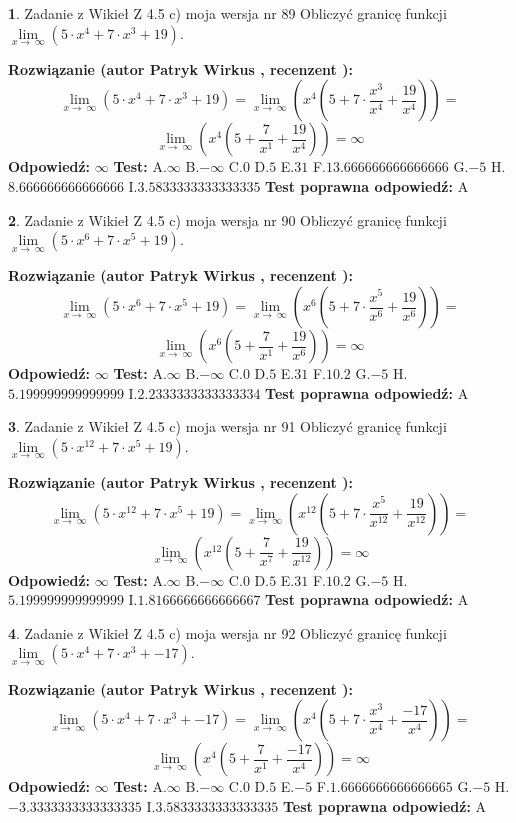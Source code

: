 \documentclass[12pt, a4paper]{article}
\theoremstyle{definition} %
\newtheorem{zad}{}
\newcommand{\zadStart}[1]{\begin{zad}#1\newline}
\newcommand{\zadStop}{\end{zad}}
\newcommand{\rozwStart}[2]{\noindent \textbf{Rozwiązanie (autor #1 , recenzent #2): }\newline}
\newcommand{\rozwStop}{\newline}
\newcommand{\odpStart}{\noindent \textbf{Odpowiedź:}\newline}
\newcommand{\odpStop}{\newline}
\newcommand{\testStart}{\noindent \textbf{Test:}\newline}
\newcommand{\testStop}{\newline}
\newcommand{\kluczStart}{\noindent \textbf{Test poprawna odpowiedź:}\newline}
\newcommand{\kluczStop}{\newline}
\begin{document}
\zadStart{Zadanie z Wikieł Z 4.5 c) moja wersja nr 89}
Obliczyć granicę funkcji  $\lim\limits_{x\to\ \infty}(5 \cdot x^{4}+7 \cdot x^{3}+19)$.
\zadStop
\rozwStart{Patryk Wirkus}{}
$$\lim\limits_{x\to\ \infty}(5 \cdot x^{4}+7 \cdot x^{3}+19) = \lim\limits_{x\to\ \infty}(x^{4}(5 +7 \cdot \frac{x^{3}}{x^{4}}+\frac{19}{x^{4}})) =$$ $$\lim\limits_{x\to\ \infty}(x^{4}(5 +\frac{7}{x^{1}}+\frac{19}{x^{4}})) =\infty$$
\rozwStop
\odpStart
$\infty$
\odpStop
\testStart
A.$\infty$ B.$-\infty$ C.$0$ D.$5$ E.$31$
F.$13.666666666666666$ G.$-5$
H.$8.666666666666666$
I.$3.5833333333333335$
\testStop
\kluczStart
A
\kluczStop



\zadStart{Zadanie z Wikieł Z 4.5 c) moja wersja nr 90}
Obliczyć granicę funkcji  $\lim\limits_{x\to\ \infty}(5 \cdot x^{6}+7 \cdot x^{5}+19)$.
\zadStop
\rozwStart{Patryk Wirkus}{}
$$\lim\limits_{x\to\ \infty}(5 \cdot x^{6}+7 \cdot x^{5}+19) = \lim\limits_{x\to\ \infty}(x^{6}(5 +7 \cdot \frac{x^{5}}{x^{6}}+\frac{19}{x^{6}})) =$$ $$\lim\limits_{x\to\ \infty}(x^{6}(5 +\frac{7}{x^{1}}+\frac{19}{x^{6}})) =\infty$$
\rozwStop
\odpStart
$\infty$
\odpStop
\testStart
A.$\infty$ B.$-\infty$ C.$0$ D.$5$ E.$31$
F.$10.2$ G.$-5$
H.$5.199999999999999$
I.$2.2333333333333334$
\testStop
\kluczStart
A
\kluczStop



\zadStart{Zadanie z Wikieł Z 4.5 c) moja wersja nr 91}
Obliczyć granicę funkcji  $\lim\limits_{x\to\ \infty}(5 \cdot x^{12}+7 \cdot x^{5}+19)$.
\zadStop
\rozwStart{Patryk Wirkus}{}
$$\lim\limits_{x\to\ \infty}(5 \cdot x^{12}+7 \cdot x^{5}+19) = \lim\limits_{x\to\ \infty}(x^{12}(5 +7 \cdot \frac{x^{5}}{x^{12}}+\frac{19}{x^{12}})) =$$ $$\lim\limits_{x\to\ \infty}(x^{12}(5 +\frac{7}{x^{7}}+\frac{19}{x^{12}})) =\infty$$
\rozwStop
\odpStart
$\infty$
\odpStop
\testStart
A.$\infty$ B.$-\infty$ C.$0$ D.$5$ E.$31$
F.$10.2$ G.$-5$
H.$5.199999999999999$
I.$1.8166666666666667$
\testStop
\kluczStart
A
\kluczStop



\zadStart{Zadanie z Wikieł Z 4.5 c) moja wersja nr 92}
Obliczyć granicę funkcji  $\lim\limits_{x\to\ \infty}(5 \cdot x^{4}+7 \cdot x^{3}+-17)$.
\zadStop
\rozwStart{Patryk Wirkus}{}
$$\lim\limits_{x\to\ \infty}(5 \cdot x^{4}+7 \cdot x^{3}+-17) = \lim\limits_{x\to\ \infty}(x^{4}(5 +7 \cdot \frac{x^{3}}{x^{4}}+\frac{-17}{x^{4}})) =$$ $$\lim\limits_{x\to\ \infty}(x^{4}(5 +\frac{7}{x^{1}}+\frac{-17}{x^{4}})) =\infty$$
\rozwStop
\odpStart
$\infty$
\odpStop
\testStart
A.$\infty$ B.$-\infty$ C.$0$ D.$5$ E.$-5$
F.$1.6666666666666665$ G.$-5$
H.$-3.3333333333333335$
I.$3.5833333333333335$
\testStop
\kluczStart
A
\kluczStop
\end{document}
